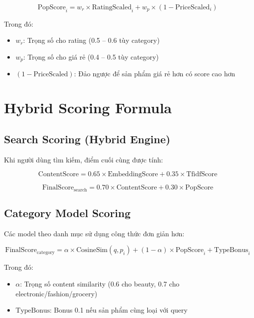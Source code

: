 \documentclass[12pt,a4paper]{report}
\begin{document}
\begin{equation}
\text{PopScore}_i = w_r \times \text{RatingScaled}_i + w_p \times (1 - \text{PriceScaled}_i)
\end{equation}

Trong đó:
\begin{itemize}
    \item $w_r$: Trọng số cho rating (0.5 -- 0.6 tùy category)
    \item $w_p$: Trọng số cho giá rẻ (0.4 -- 0.5 tùy category)
    \item $(1 - \text{PriceScaled})$: Đảo ngược để sản phẩm giá rẻ hơn có score cao hơn
\end{itemize}

\section{Hybrid Scoring Formula}

\subsection{Search Scoring (Hybrid Engine)}

Khi người dùng tìm kiếm, điểm cuối cùng được tính:

\begin{equation}
\text{ContentScore} = 0.65 \times \text{EmbeddingScore} + 0.35 \times \text{TfidfScore}
\end{equation}

\begin{equation}
\text{FinalScore}_{\text{search}} = 0.70 \times \text{ContentScore} + 0.30 \times \text{PopScore}
\end{equation}

\subsection{Category Model Scoring}

Các model theo danh mục sử dụng công thức đơn giản hơn:

\begin{equation}
\text{FinalScore}_{\text{category}} = \alpha \times \text{CosineSim}(q, p_i) + (1 - \alpha) \times \text{PopScore}_i + \text{TypeBonus}_i
\end{equation}

Trong đó:
\begin{itemize}
    \item $\alpha$: Trọng số content similarity (0.6 cho beauty, 0.7 cho electronic/fashion/grocery)
    \item $\text{TypeBonus}$: Bonus 0.1 nếu sản phẩm cùng loại với query
\end{itemize}
\end{document}
